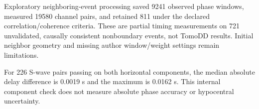 Exploratory neighboring-event processing saved 9241 observed phase windows, measured 19580 channel pairs, and retained 811 under the declared correlation/coherence criteria. These are partial timing measurements on 721 unvalidated, causally consistent nonboundary events, not TomoDD results. Initial neighbor geometry and missing author window/weight settings remain limitations.

For 226 S-wave pairs passing on both horizontal components, the median absolute delay difference is 0.0019 s and the maximum is 0.0162 s. This internal component check does not measure absolute phase accuracy or hypocentral uncertainty.
